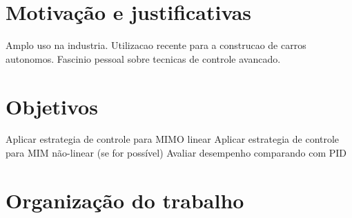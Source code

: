 \section{Motivação e justificativas}

Amplo uso na industria.
Utilizacao recente para a construcao de carros autonomos.
Fascinio pessoal sobre tecnicas de controle avancado.

\section{Objetivos}

Aplicar estrategia de controle para MIMO linear
Aplicar estrategia de controle para MIM não-linear (se for possível)
Avaliar desempenho comparando com PID

\section{Organização do trabalho}